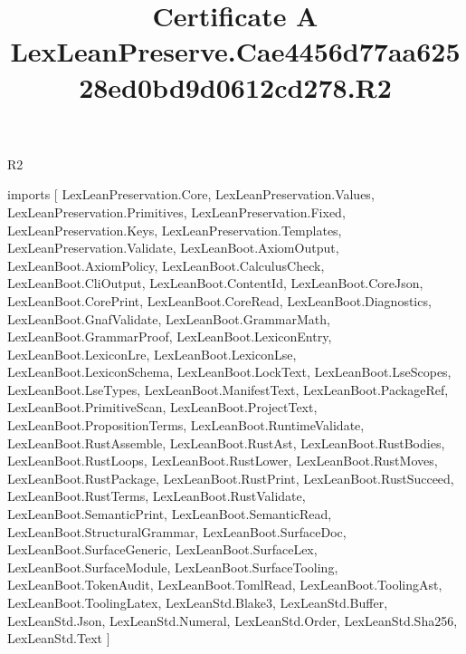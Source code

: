 \begin{lexlean}{R2}
\title{Certificate A LexLeanPreserve.Cae4456d77aa62528ed0bd9d0612cd278.R2}
\begin{coremodule}
imports [
  LexLeanPreservation.Core,
  LexLeanPreservation.Values,
  LexLeanPreservation.Primitives,
  LexLeanPreservation.Fixed,
  LexLeanPreservation.Keys,
  LexLeanPreservation.Templates,
  LexLeanPreservation.Validate,
  LexLeanBoot.AxiomOutput,
  LexLeanBoot.AxiomPolicy,
  LexLeanBoot.CalculusCheck,
  LexLeanBoot.CliOutput,
  LexLeanBoot.ContentId,
  LexLeanBoot.CoreJson,
  LexLeanBoot.CorePrint,
  LexLeanBoot.CoreRead,
  LexLeanBoot.Diagnostics,
  LexLeanBoot.GnafValidate,
  LexLeanBoot.GrammarMath,
  LexLeanBoot.GrammarProof,
  LexLeanBoot.LexiconEntry,
  LexLeanBoot.LexiconLre,
  LexLeanBoot.LexiconLse,
  LexLeanBoot.LexiconSchema,
  LexLeanBoot.LockText,
  LexLeanBoot.LseScopes,
  LexLeanBoot.LseTypes,
  LexLeanBoot.ManifestText,
  LexLeanBoot.PackageRef,
  LexLeanBoot.PrimitiveScan,
  LexLeanBoot.ProjectText,
  LexLeanBoot.PropositionTerms,
  LexLeanBoot.RuntimeValidate,
  LexLeanBoot.RustAssemble,
  LexLeanBoot.RustAst,
  LexLeanBoot.RustBodies,
  LexLeanBoot.RustLoops,
  LexLeanBoot.RustLower,
  LexLeanBoot.RustMoves,
  LexLeanBoot.RustPackage,
  LexLeanBoot.RustPrint,
  LexLeanBoot.RustSucceed,
  LexLeanBoot.RustTerms,
  LexLeanBoot.RustValidate,
  LexLeanBoot.SemanticPrint,
  LexLeanBoot.SemanticRead,
  LexLeanBoot.StructuralGrammar,
  LexLeanBoot.SurfaceDoc,
  LexLeanBoot.SurfaceGeneric,
  LexLeanBoot.SurfaceLex,
  LexLeanBoot.SurfaceModule,
  LexLeanBoot.SurfaceTooling,
  LexLeanBoot.TokenAudit,
  LexLeanBoot.TomlRead,
  LexLeanBoot.ToolingAst,
  LexLeanBoot.ToolingLatex,
  LexLeanStd.Blake3,
  LexLeanStd.Buffer,
  LexLeanStd.Json,
  LexLeanStd.Numeral,
  LexLeanStd.Order,
  LexLeanStd.Sha256,
  LexLeanStd.Text
]


\end{coremodule}
\end{lexlean}
